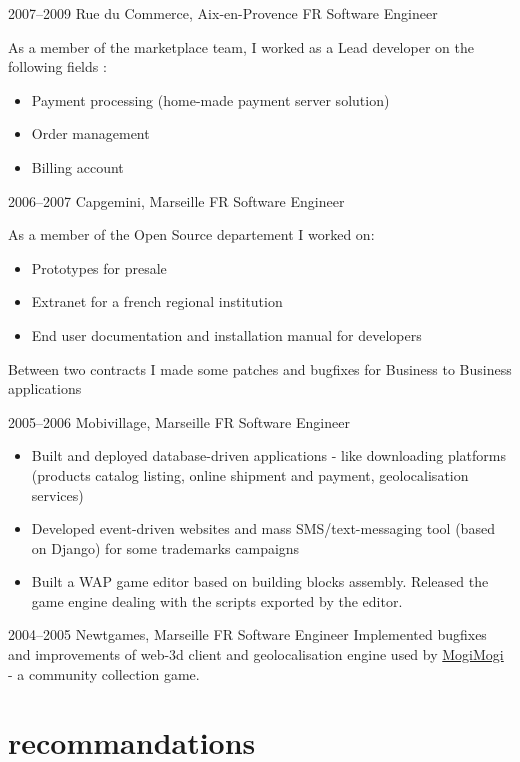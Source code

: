 \documentclass[]{friggeri-cv}
\begin{document}
\clearpage

\begin{entrylist}
  \entry
    {2007–2009}
    {Rue du Commerce, Aix-en-Provence FR}
    {Software Engineer}
    {As a member of the marketplace team, I worked as a Lead developer on the following fields :
    \begin{itemize}
    \item Payment processing (home-made payment server solution)
    \item Order management
    \item Billing account
    \end{itemize}}
  \entry
    {2006–2007}
    {Capgemini, Marseille FR}
    {Software Engineer}
    {As a member of the Open Source departement I worked on:
    \begin{itemize}
    \item Prototypes for presale
    \item Extranet for a french regional institution
    \item End user documentation and installation manual for developers
    \end{itemize}
    Between two contracts I made some patches and bugfixes for Business to Business applications}
  \entry
    {2005–2006}
    {Mobivillage, Marseille FR}
    {Software Engineer}
    {\begin{itemize}
    \item Built and deployed database-driven applications - like downloading platforms (products catalog listing, online shipment and payment, geolocalisation services)
    \item Developed event-driven websites and mass SMS/text-messaging tool (based on Django) for some trademarks campaigns
    \item Built a WAP game editor based on building blocks assembly. Released the game engine dealing with the scripts exported by the editor.
    \end{itemize}}
  \entry
    {2004–2005}
    {Newtgames, Marseille FR}
    {Software Engineer}
    {Implemented bugfixes and improvements of web-3d client and geolocalisation engine used by \href{http://mogimogi.com}{MogiMogi} - a community collection game.}
\end{entrylist}

\clearpage

\section{recommandations}
\end{document}
